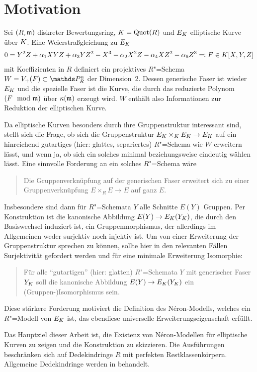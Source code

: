 \chapter{Motivation}

Sei $(R,\mathfrak{m})$ diskreter Bewertungsring, $K=\operatorname{Quot}(R)$ und $E_{K}$
elliptische Kurve über $K$. Eine Weierstraßgleichung zu $E_{K}$
\begin{gather*}
  0 = Y^2 Z + \alpha_1 XYZ + \alpha_3 YZ^2 - X^3 - \alpha_2X^2 Z - \alpha_4 XZ^2 - \alpha_6 Z^3
  \eqqcolon F\in K[X,Y,Z]  
\end{gather*}
mit Koeffizienten in $R$ definiert ein projektives $R$"=Schema
$W=V_+(F)\subset\P_R^n$ der Dimension~2. Dessen generische Faser
ist wieder $E_{K}$ und die spezielle Faser ist die Kurve, die durch das
reduzierte Polynom $(F\mod{\mathfrak{m}})$ über $\kappa(\mathfrak{m})$ erzeugt wird.
$W$ enthält also Informationen zur Reduktion der elliptischen
Kurve.

Da elliptische Kurven besonders durch ihre Gruppenstruktur
interessant sind, stellt sich die Frage, ob sich die
Gruppenstruktur $E_{K}\times_{K} E_{K}\to E_{K}$ auf ein hinreichend
gutartiges (hier: glattes, separiertes) $R$"=Schema wie $W$ erweitern
lässt, und wenn ja, ob sich ein solches minimal beziehungsweise
eindeutig wählen lässt.
Eine sinnvolle Forderung an ein solches $R$"=Schema wäre
\begin{quote}
  Die Gruppenverknüpfung auf der generischen Faser erweitert sich zu
  einer Gruppenverknüpfung $E\times_R E\to E$ auf ganz $E$.
\end{quote}
Insbesondere sind dann für $R$"=Schemata $Y$ alle Schnitte $E(Y)$
Gruppen. Per Konstruktion ist die kanonische Abbildung
$E(Y)\to E_{K}(Y_{K})$, die durch den Basiswechsel induziert ist, ein
Gruppenmorphismus, der allerdings im Allgemeinen weder surjektiv noch
injektiv ist. Um von einer Erweiterung der Gruppenstruktur sprechen zu
können, sollte hier in den relevanten Fällen Surjektivität
gefordert werden und für eine minimale Erweiterung Isomorphie:
\begin{quote}
  Für alle \enquote{gutartigen} (hier: glatten) $R$"=Schemata $Y$ mit
  generischer Faser $Y_{K}$ soll die kanonische Abbildung
  $E(Y)\to E_{K}(Y_{K})$ ein (Gruppen-)Isomorphismus sein.
\end{quote}
Diese stärkere Forderung motiviert die Definition des
Néron-Modells, welches ein $R$"=Modell von $E_{K}$ ist, das ebendiese
universelle Erweiterungseigenschaft erfüllt.

Das Hauptziel dieser Arbeit ist, die Existenz von Néron-Modellen
für elliptische Kurven zu zeigen und die Konstruktion zu skizzieren.
Die Ausführungen beschränken sich auf Dedekindringe $R$ mit perfekten
Restklassenkörpern. Allgemeine Dedekindringe werden in
\cite{nonperfect} behandelt.

